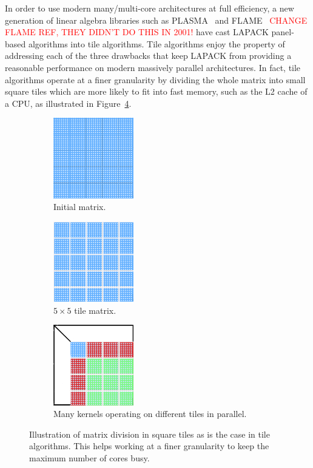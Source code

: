 In order to use modern many/multi-core architectures at full
efficiency, a new generation of linear algebra libraries such as
PLASMA~\cite{DBLP:journals/corr/abs-0709-1272} and FLAME~\cite{FLAWN3}
\textcolor{red}{CHANGE FLAME REF, THEY DIDN'T DO THIS IN 2001!}
have cast LAPACK panel-based algorithms into tile algorithms. Tile
algorithms enjoy the property of addressing each of the three
drawbacks that keep LAPACK from providing a reasonable performance on
modern massively parallel architectures.
In fact, tile algorithms operate at a
finer granularity by dividing the whole matrix into
small square tiles which are more likely to fit into fast memory,
such as the L2 cache of a CPU, as illustrated in Figure~\ref{fig:tile_algo}.
\begin{figure}[th]
  \captionsetup[subfigure]{justification=justified,singlelinecheck=false}
  \begin{subfigure}[t]{0.3 \textwidth}
    \includegraphics[width=3.5cm, height=3.5cm]{fig/one-sided-initial}
    \caption{\label{fig:initial_matrix}Initial matrix.}
  \end{subfigure}
  \hfill
  \begin{subfigure}[t]{0.3 \textwidth}
    \includegraphics[width=3.5cm, height=3.5cm]{fig/one-sided-tile}
    \caption{\label{fig:tile_matrix}
      $5\times 5$ tile matrix.}
  \end{subfigure}
  \hfill
    \begin{subfigure}[t]{0.3 \textwidth}
    \includegraphics[width=3.5cm, height=3.5cm]{fig/one-sided-tile-facto}
    \caption{\label{fig:tile_facto}
     Many kernels operating on different tiles in parallel.}
  \end{subfigure}
  \caption{Illustration of matrix division in square tiles as is the case
    in tile algorithms. This helps working at  a finer granularity to
    keep the maximum number of cores busy.}
    \label{fig:tile_algo}
\end{figure}

